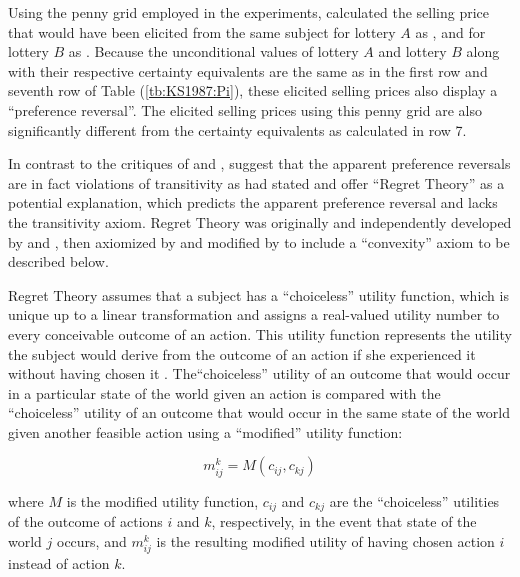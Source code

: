 \documentclass[../main.tex]{subfiles}
\begin{document}
Using the penny grid employed in the \textcite{Grether1979} experiments, \textcite[680]{Karni1987} calculated the selling price that would have been elicited from the same subject for lottery $A$ as , and for lottery $B$ as .
Because the unconditional values of lottery $A$ and lottery $B$ along with their respective certainty equivalents are the same as in the first row and seventh row of Table (\ref{tb:KS1987:Pi}), these elicited selling prices also display a \enquote{preference reversal}.
The elicited selling prices using this penny grid are also significantly different from the certainty equivalents as calculated in row 7.

In contrast to the critiques of \textcite{Holt1986} and \textcite{Karni1987}, \textcite{Loomes1989} suggest that the apparent preference reversals are in fact violations of transitivity as \textcite[623]{Grether1979} had stated and offer \enquote{Regret Theory} as a potential explanation, which predicts the apparent preference reversal and lacks the transitivity axiom.
Regret Theory was originally and independently developed by \textcite{Loomes1982} and \textcite{Bell1982}, then axiomized by \textcite{Fishburn1987} and modified by \textcite{Loomes1987} to include a \enquote{convexity} axiom to be described below.

Regret Theory assumes that a subject has a \enquote{choiceless} utility function, which is unique up to a linear transformation and assigns a real-valued utility number to every conceivable outcome of an action.
This utility function represents the utility the subject would derive from the outcome of an action if she experienced it without having chosen it \textcite[807]{Loomes1987}.
The\enquote{choiceless} utility of an outcome that would occur in a particular state of the world given an action is compared with the \enquote{choiceless} utility of an outcome that would occur in the same state of the world given another feasible action using a \enquote{modified} utility function:

\begin{equation}
	\label{eq:LS1987:mu}
	m^k_{ij} = M( c_{ij} , c_{kj} )
\end{equation}

\noindent where $M$ is the modified utility function, $c_{ij}$ and $c_{kj}$ are the \enquote{choiceless} utilities of the outcome of actions $i$ and $k$, respectively, in the event that state of the world $j$ occurs, and $m^k_{ij}$ is the resulting modified utility of having chosen action $i$ instead of action $k$.
\end{document}
